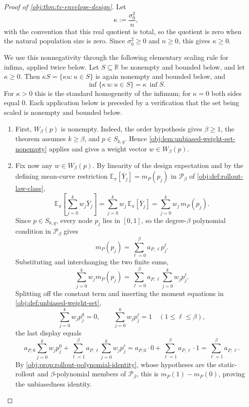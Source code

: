 \documentclass[11pt]{article}
\begin{document}
\begin{proof}[Proof of \cref{obj:thm:tv-envelope-design}]
Let
\[
\kappa:=\frac{\sigma_0^2}{n},
\]
with the convention that this real quotient is total, so the quotient is zero when the natural population size is zero. Since \(\sigma_0^2\ge0\) and \(n\ge0\), this gives \(\kappa\ge0\). %

We use this nonnegativity through the following elementary scaling rule for infima, applied twice below. Let \(S\subseteq\mathbb R\) be nonempty and bounded below, and let \(\kappa\ge0\). Then \(\kappa S=\{\kappa u:u\in S\}\) is again nonempty and bounded below, and
\[
\inf\{\kappa\,u:u\in S\}=\kappa\,\inf S .
\]
For \(\kappa>0\) this is the standard homogeneity of the infimum; for \(\kappa=0\) both sides equal \(0\). Each application below is preceded by a verification that the set being scaled is nonempty and bounded below. %

\begin{enumerate}
\item
First, \(W_\beta(p)\) is nonempty. Indeed, the order hypothesis gives \(\beta\ge 1\), the theorem assumes \(k\ge \beta\), and \(p\in S_{k,q}\). Hence \cref{obj:lem:unbiased-weight-set-nonempty} applies and gives a weight vector \(w\in W_\beta(p)\). %

\item
Fix now any \(w\in W_\beta(p)\). By linearity of the design expectation and by the defining mean-curve restriction \(\mathbb E_\pi[\bar Y_j]=m_P(p_j)\) in \(\mathcal P_\beta\) of \cref{obj:def:rollout-law-class},
\[
\mathbb E_\pi\!\left[\sum_{j=0}^k w_j\bar Y_j\right]
=
\sum_{j=0}^k w_j\,\mathbb E_\pi[\bar Y_j]
=
\sum_{j=0}^k w_j\,m_P(p_j).
\]
Since \(p\in S_{k,q}\), every node \(p_j\) lies in \([0,1]\), so the degree-\(\beta\) polynomial condition in \(\mathcal P_\beta\) gives
\[
m_P(p_j)=\sum_{\ell=0}^{\beta} a_{P,\ell}p_j^\ell .
\]
Substituting and interchanging the two finite sums,
\[
\sum_{j=0}^k w_jm_P(p_j)
=
\sum_{\ell=0}^{\beta}
a_{P,\ell}\sum_{j=0}^k w_jp_j^\ell .
\]
Splitting off the constant term and inserting the moment equations in \cref{obj:def:unbiased-weight-set},
\[
\sum_{j=0}^k w_jp_j^0=0,
\qquad
\sum_{j=0}^k w_jp_j^\ell=1
\quad(1\le \ell\le \beta),
\]
the last display equals
\[
a_{P,0}\sum_{j=0}^k w_jp_j^0
+
\sum_{\ell=1}^{\beta}a_{P,\ell}\sum_{j=0}^k w_jp_j^\ell
=
a_{P,0}\cdot 0+\sum_{\ell=1}^{\beta}a_{P,\ell}\cdot 1
=
\sum_{\ell=1}^{\beta}a_{P,\ell}.
\]
By \cref{obj:prop:rollout-polynomial-identity}, whose hypotheses are the static-rollout and \(\beta\)-polynomial members of \(\mathcal P_\beta\), this is \(m_P(1)-m_P(0)\), proving the unbiasedness identity. %


\end{enumerate}
\end{proof}
\end{document}
